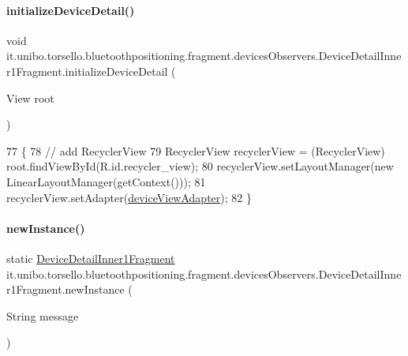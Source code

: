 \paragraph{\texorpdfstring{initialize\+Device\+Detail()}{initializeDeviceDetail()}}
{\footnotesize\ttfamily void it.\+unibo.\+torsello.\+bluetoothpositioning.\+fragment.\+devices\+Observers.\+Device\+Detail\+Inner1\+Fragment.\+initialize\+Device\+Detail (\begin{DoxyParamCaption}\item[{View}]{root }\end{DoxyParamCaption})\hspace{0.3cm}{\ttfamily [private]}}


\begin{DoxyCode}
77                                                    \{
78         \textcolor{comment}{// add RecyclerView}
79         RecyclerView recyclerView = (RecyclerView) root.findViewById(R.id.recycler\_view);
80         recyclerView.setLayoutManager(\textcolor{keyword}{new} LinearLayoutManager(getContext()));
81         recyclerView.setAdapter(\hyperlink{classit_1_1unibo_1_1torsello_1_1bluetoothpositioning_1_1fragment_1_1devicesObservers_1_1DeviceDetailInner1Fragment_a981ec49aae98052b414864feb742cbc5_a981ec49aae98052b414864feb742cbc5}{deviceViewAdapter});
82     \}
\end{DoxyCode}
\hypertarget{classit_1_1unibo_1_1torsello_1_1bluetoothpositioning_1_1fragment_1_1devicesObservers_1_1DeviceDetailInner1Fragment_ac6fb79b1fec7580e8b96b414bfccd4d6_ac6fb79b1fec7580e8b96b414bfccd4d6}{}\label{classit_1_1unibo_1_1torsello_1_1bluetoothpositioning_1_1fragment_1_1devicesObservers_1_1DeviceDetailInner1Fragment_ac6fb79b1fec7580e8b96b414bfccd4d6_ac6fb79b1fec7580e8b96b414bfccd4d6} 
\paragraph{\texorpdfstring{new\+Instance()}{newInstance()}}
{\footnotesize\ttfamily static \hyperlink{classit_1_1unibo_1_1torsello_1_1bluetoothpositioning_1_1fragment_1_1devicesObservers_1_1DeviceDetailInner1Fragment}{Device\+Detail\+Inner1\+Fragment} it.\+unibo.\+torsello.\+bluetoothpositioning.\+fragment.\+devices\+Observers.\+Device\+Detail\+Inner1\+Fragment.\+new\+Instance (\begin{DoxyParamCaption}\item[{String}]{message }\end{DoxyParamCaption})\hspace{0.3cm}{\ttfamily [static]}}



